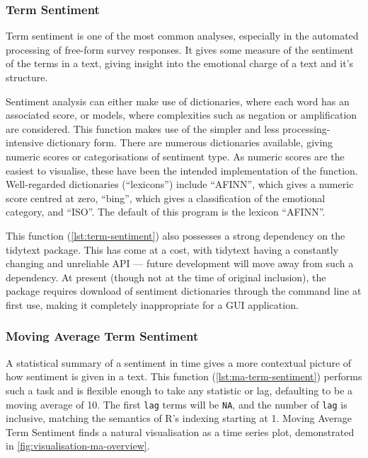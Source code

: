 \documentclass[11pt, a4paper, twoside, titlepage]{report}
\begin{document}
\subsubsection{Term Sentiment}\label{sec:term-sentiment}

Term sentiment is one of the most common analyses, especially in the
automated processing of free-form survey responses. It gives some
measure of the sentiment of the terms in a text, giving insight into
the emotional charge of a text and it's structure.

Sentiment analysis can either make use of dictionaries, where each
word has an associated score, or models, where complexities such as
negation or amplification are considered. This function makes use of
the simpler and less processing-intensive dictionary form. There are
numerous dictionaries available, giving numeric scores or
categorisations of sentiment type. As numeric scores are the easiest
to visualise, these have been the intended implementation of the
function. Well-regarded dictionaries (``lexicons'') include ``AFINN'',
which gives a numeric score centred at zero, ``bing'', which gives a
classification of the emotional category, and ``ISO''. The default of
this program is the lexicon ``AFINN''.

This function (\cref{lst:term-sentiment}) also possesses a
strong dependency on the tidytext package. This has come at a cost,
with tidytext having a constantly changing and unreliable API ---
future development will move away from such a dependency. At present
(though not at the time of original inclusion), the package requires
download of sentiment dictionaries through the command line at first
use, making it completely inappropriate for a GUI application.

\subsubsection{Moving Average Term Sentiment}\label{sec:moving-average-term}

A statistical summary of a sentiment in time gives a more contextual
picture of how sentiment is given in a text. This function
(\cref{lst:ma-term-sentiment}) performs such a task and is
flexible enough to take any statistic or lag, defaulting to be a
moving average of 10. The first \texttt{lag} terms will be
\texttt{NA}, and the number of \texttt{lag} is
inclusive, matching the semantics of R's indexing starting at 1.
Moving Average Term Sentiment finds a natural visualisation as a time
series plot, demonstrated in \cref{fig:visualisation-ma-overview}.
\end{document}
